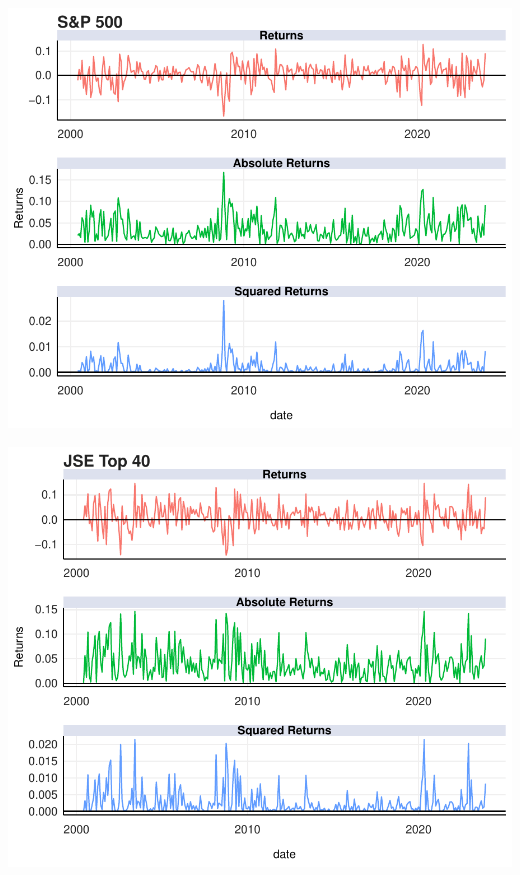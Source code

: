 \documentclass[11pt,preprint, authoryear]{elsarticle}
\let\origfigure\figure
\let\endorigfigure\endfigure
\renewenvironment{figure}[1][2] {
    \expandafter\origfigure\expandafter[H]
} {
    \endorigfigure
}
\numberwithin{equation}{section}
\numberwithin{figure}{section}
\numberwithin{table}{section}
\begin{document}
\begin{figure}[H]

{\centering \includegraphics{Template_files/figure-latex/Figure1-1} 

}

\caption{S\&P 500 Returns \label{Figure1}}\label{fig:Figure1}
\end{figure}

\begin{figure}[H]

{\centering \includegraphics{Template_files/figure-latex/Figure2-1} 

}

\caption{JSE Top 40 Returns \label{Figure2}}\label{fig:Figure2}
\end{figure}
\end{document}

